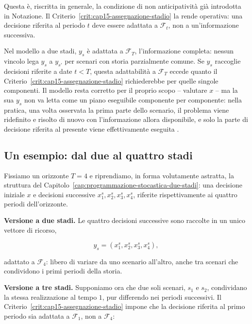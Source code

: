 Questa \`e, riscritta in generale, la condizione di non anticipativit\`a
gi\`a introdotta in Notazione. Il Criterio~\ref{crit:cap15-assegnazione-stadio}
la rende operativa: una decisione riferita al periodo $t$ deve essere
adattata a $\mathcal F_t$, non a un'informazione successiva.

\begin{remark}

Nel modello a due stadi, $y_s$ \`e adattata a $\mathcal F_T$, l'informazione
completa: nessun vincolo lega $y_s$ a $y_{s'}$ per scenari con storia
parzialmente comune. Se $y_s$ raccoglie decisioni riferite a date $t<T$,
questa adattabilit\`a a $\mathcal F_T$ eccede quanto il
Criterio~\ref{crit:cap15-assegnazione-stadio} richiederebbe per quelle
singole componenti. Il modello resta corretto per il proprio scopo --
valutare $x$ -- ma la sua $y_s$ non va letta come un piano eseguibile
componente per componente: nella pratica, una volta osservata la prima parte
dello scenario, il problema viene ridefinito e risolto di nuovo con
l'informazione allora disponibile, e solo la parte di decisione riferita al
presente viene effettivamente eseguita \cite{BirgeLouveaux}.

\end{remark}

\subsection{Un esempio: dal due al quattro stadi}

Fissiamo un orizzonte $T=4$ e riprendiamo, in forma volutamente astratta, la
struttura del Capitolo~\ref{cap:programmazione-stocastica-due-stadi}: una
decisione iniziale $x$ e decisioni successive $x_1^s,x_2^s,x_3^s,x_4^s$,
riferite rispettivamente ai quattro periodi dell'orizzonte.

\medskip
\noindent
\textbf{Versione a due stadi.} Le quattro decisioni successive sono raccolte
in un unico vettore di ricorso,

\[
y_s=(x_1^s,x_2^s,x_3^s,x_4^s),
\]

adattato a $\mathcal F_4$: libero di variare da uno scenario all'altro, anche
tra scenari che condividono i primi periodi della storia.

\medskip
\noindent
\textbf{Versione a tre stadi.} Supponiamo ora che due soli scenari, $s_1$ e
$s_2$, condividano la stessa realizzazione al tempo $1$, pur differendo nei
periodi successivi. Il Criterio~\ref{crit:cap15-assegnazione-stadio} impone
che la decisione riferita al primo periodo sia adattata a $\mathcal F_1$, non
a $\mathcal F_4$:

